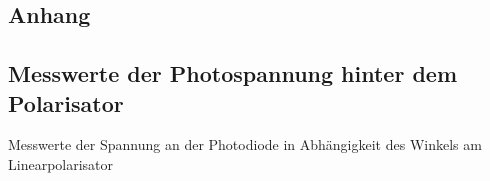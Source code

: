 \documentclass[11pt, a4paper]{article}
\numberwithin{equation}{section}
\begin{document}
\clearpage

\begin{appendix}
\section{Anhang}
\subsection{Messwerte der Photospannung hinter dem Polarisator}
\begin{table}[htb]
	\centering
	\resizebox{0.85\textwidth}{!}{
	}
	\caption{Messwerte der Spannung an der Photodiode in Abhängigkeit des Winkels am Linearpolarisator}
	\label{tab:malus}
\end{table}
\clearpage


\end{appendix}
\end{document}
